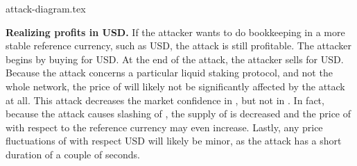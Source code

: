 
{attack-diagram.tex}

\noindent
\textbf{Realizing profits in USD.}
If the attacker wants to do bookkeeping in a more stable reference currency,
such as USD, the attack is still profitable. The attacker begins by buying
\asset for USD. At the end of the attack, the attacker sells \asset for USD.
Because the attack concerns a particular liquid staking protocol, and
not the whole \asset network, the price of \asset will likely not
be significantly affected by the attack at all.
This attack decreases the market confidence in \stasset,
but not in \asset.
In fact, because
the attack causes slashing of \asset, the supply of \asset is decreased
and the price of \asset with respect to the reference currency may
even increase.
Lastly, any price fluctuations of \asset with respect USD will likely be
minor, as the attack has a short duration of a couple of seconds.

